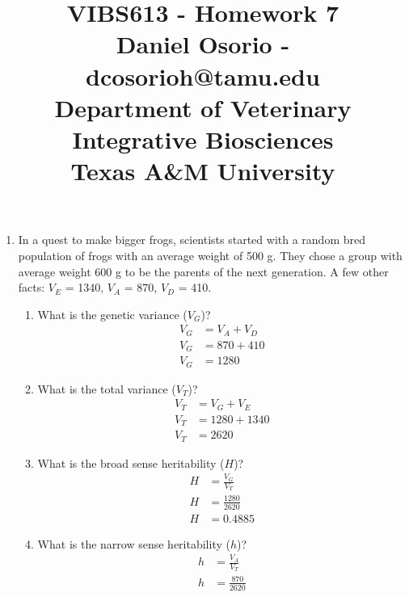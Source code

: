 \documentclass[12pt,a4paper]{paper}
\begin{document}

\title{VIBS613 - Homework 7\\\small{Daniel Osorio - dcosorioh@tamu.edu\\Department of Veterinary Integrative Biosciences\\Texas A\&M University}}
\maketitle
\begin{enumerate}
\item  In a quest to make bigger frogs, scientists started with a random bred population of frogs with an average weight of 500 g. They chose a group with average weight 600 g to be
the parents of the next generation. A few other facts: $V_E$ = 1340, $V_A$ = 870, $V_D$ = 410.
\begin{enumerate}
\item What is the genetic variance ($V_G$)?\\
\begin{equation*}
\begin{split}
V_{G} &= V_{A} + V_{D}\\
V_{G} &= 870 + 410\\
V_{G} &= 1280
\end{split}
\end{equation*}
\item What is the total variance ($V_T$)?
\begin{equation*}
\begin{split}
V_{T} &= V_{G} + V_{E}\\
V_{T} &= 1280 + 1340\\
V_{T} &= 2620
\end{split}
\end{equation*}
\item What is the broad sense heritability ($H$)?
\begin{equation*}
\begin{split}
H &= \frac{V_{G}}{V_{T}}\\
H &= \frac{1280}{2620}\\
H &= 0.4885
\end{split}
\end{equation*}
\item What is the narrow sense heritability ($h$)?
\begin{equation*}
\begin{split}
h &= \frac{V_{A}}{V_{T}}\\
h &= \frac{870}{2620}\\

\end{split}
\end{equation*}
\end{enumerate}
\end{enumerate}
\end{document}
